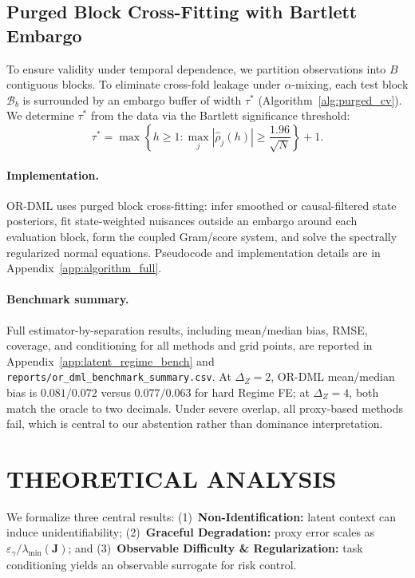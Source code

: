 \documentclass[twoside]{article}
\theoremstyle{definition}
\begin{document}
\subsection{Purged Block Cross-Fitting with Bartlett Embargo}
To ensure validity under temporal dependence, we partition observations into $B$ contiguous blocks. To eliminate cross-fold leakage under $\alpha$-mixing, each test block $\mathcal{B}_b$ is surrounded by an embargo buffer of width $\tau^*$ (Algorithm~\ref{alg:purged_cv}). We determine $\tau^*$ from the data via the Bartlett significance threshold:
\begin{equation}
    \tau^* = \max \left\{ h \ge 1 : \max_{j} \left| \hat{\rho}_j(h) \right| \ge \frac{1.96}{\sqrt{N}} \right\} + 1.
\end{equation}

\paragraph{Implementation.} OR-DML uses purged block cross-fitting: infer smoothed or causal-filtered state posteriors, fit state-weighted nuisances outside an embargo around each evaluation block, form the coupled Gram/score system, and solve the spectrally regularized normal equations. Pseudocode and implementation details are in Appendix~\ref{app:algorithm_full}.


\paragraph{Benchmark summary.} Full estimator-by-separation results, including mean/median bias, RMSE, coverage, and conditioning for all methods and grid points, are reported in Appendix~\ref{app:latent_regime_bench} and \texttt{reports/or\_dml\_benchmark\_summary.csv}. At $\Delta_Z=2$, OR-DML mean/median bias is $0.081/0.072$ versus $0.077/0.063$ for hard Regime FE; at $\Delta_Z=4$, both match the oracle to two decimals. Under severe overlap, all proxy-based methods fail, which is central to our abstention rather than dominance interpretation.


\section{THEORETICAL ANALYSIS}
\label{sec:theory}

We formalize three central results: (1)~\textbf{Non-Identification:} latent context can induce unidentifiability; (2)~\textbf{Graceful Degradation:} proxy error scales as $\varepsilon_\gamma/\lambda_{\min}(\boldsymbol{J})$; and (3)~\textbf{Observable Difficulty \& Regularization:} task conditioning yields an observable surrogate for risk control.
\end{document}
